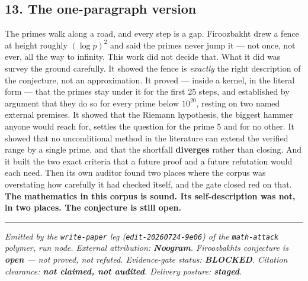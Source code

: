 \documentclass[
  a4paper,
  11pt]{article}
\begin{document}
\subsection{13. The one-paragraph
version}\label{13-the-one-paragraph-version}

The primes walk along a road, and every step is a gap. Firoozbakht drew
a fence at height roughly \((\log p)^2\) and said the primes never jump
it --- not once, not ever, all the way to infinity. This work did not
decide that. What it did was survey the ground carefully. It showed the
fence is \emph{exactly} the right description of the conjecture, not an
approximation. It proved --- inside a kernel, in the literal form ---
that the primes stay under it for the first 25 steps, and established by
argument that they do so for every prime below \(10^{20}\), resting on
two named external premises. It showed that the Riemann hypothesis, the
biggest hammer anyone would reach for, settles the question for the
prime 5 and for no other. It showed that no unconditional method in the
literature can extend the verified range by a single prime, and that the
shortfall \textbf{diverges} rather than closing. And it built the two
exact criteria that a future proof and a future refutation would each
need. Then its own auditor found two places where the corpus was
overstating how carefully it had checked itself, and the gate closed red
on that. \textbf{The mathematics in this corpus is sound. Its
self-description was not, in two places. The conjecture is still open.}

\begin{center}\rule{0.5\linewidth}{0.5pt}\end{center}

\emph{Emitted by the \texttt{write-paper} leg
(\texttt{edit-20260724-9e06}) of the \texttt{math-attack} polymer, run
node. External attribution: \textbf{Noogram}.
Firoozbakht\textquotesingle s conjecture is \textbf{open} --- not
proved, not refuted. Evidence-gate status: \textbf{BLOCKED}. Citation
clearance: \textbf{not claimed, not audited}. Delivery posture:
\textbf{staged}.}

\printbibliography
\end{document}
